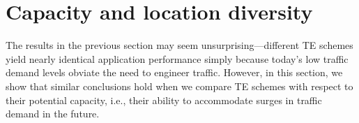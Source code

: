 \section{Capacity and location diversity}
\label{sec:capacity}




%	

%	
%	








The results in the previous section may seem unsurprising---different TE schemes yield nearly identical application performance simply because today's low traffic demand levels obviate the need to engineer traffic. However, in this section, we show that similar conclusions hold when we compare TE schemes with respect to their potential capacity, i.e., their ability to accommodate surges in traffic demand in the future.

